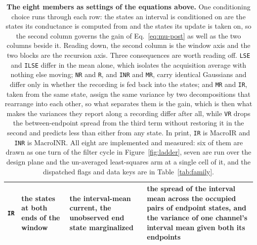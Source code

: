 \begin{table}[htbp]
\begin{fullwidth}
\begin{tabularx}{\linewidth}{@{}l
    >{\hsize=0.80\hsize\raggedright\arraybackslash}X
    >{\hsize=0.95\hsize\raggedright\arraybackslash}X
    >{\hsize=1.25\hsize\raggedright\arraybackslash}X@{}}
\texttt{IR} & the states at both ends of the window & the interval-mean current, the unobserved end state marginalized & the spread of the interval mean across the occupied pairs of endpoint states, and the variance of one channel's interval mean given both its endpoints \\
\bottomrule
\end{tabularx}
\end{fullwidth}
\caption{\textbf{The eight members as settings of the equations above.} One conditioning
choice runs through each row: the states an interval is conditioned on are the states its
conductance is computed from and the states its update is taken on, so the second column
governs the gain of Eq.~\ref{eq:mu-post} as well as the two columns beside it. Reading down,
the second column is the window axis and the two blocks are the recursion axis. Three
consequences are worth reading off. \texttt{LSE} and \texttt{ILSE} differ in the mean alone,
which isolates the acquisition average with nothing else moving; \texttt{NR} and \texttt{R},
and \texttt{INR} and \texttt{MR}, carry identical Gaussians and differ only in whether the
recording is fed back into the states; and \texttt{MR} and \texttt{IR}, taken from the same
state, assign the same variance by two decompositions that rearrange into each other, so
what separates them is the gain, which is then what makes the variances they report along a
recording differ after all, while \texttt{VR} drops the between-endpoint spread from the
third term without restoring it in the second and predicts less than either from any
state. In print, \texttt{IR} is
MacroIR and \texttt{INR} is MacroINR. All eight are implemented and measured: six of them are
drawn as one turn of the filter cycle in Figure~\ref{fig:ladder}, seven are run over the
design plane and the un-averaged least-squares arm at a single cell of it, and the
dispatched flags and data keys are in Table~\ref{tab:family}.} %
\label{tab:members}
\end{table}

